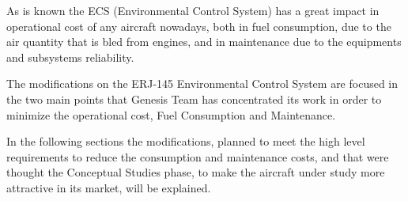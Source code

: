 ﻿As is known the ECS (Environmental Control System) has a great impact in operational cost of any aircraft  nowadays, both in fuel consumption, due to the air quantity that is bled from engines, and in maintenance due to the equipments and subsystems reliability.

The modifications on the ERJ-145 Environmental Control System are focused in the two main points that Genesis Team has concentrated its work in order to minimize the operational cost, Fuel Consumption and Maintenance.

In the following sections the modifications, planned to meet the high level
requirements to reduce the consumption and maintenance costs, and that were thought the Conceptual
Studies phase, to make the aircraft under study more attractive in its market, will be explained.
